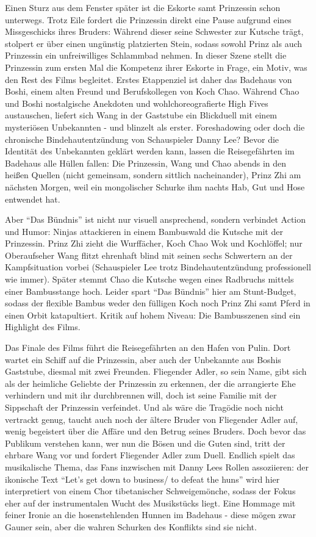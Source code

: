 \documentclass[final]{multiversum}
\begin{document}
Einen Sturz aus dem Fenster später ist die Eskorte samt Prinzessin schon unterwegs. Trotz Eile fordert die Prinzessin
direkt eine Pause aufgrund eines Missgeschicks ihres Bruders: Während dieser seine Schwester zur Kutsche trägt,
stolpert er über einen ungünstig platzierten Stein, sodass sowohl Prinz als auch Prinzessin ein unfreiwilliges
Schlammbad nehmen.
In dieser Szene stellt die Prinzessin zum ersten Mal die Kompetenz ihrer Eskorte in Frage, ein Motiv,
was den Rest des Films begleitet.
Erstes Etappenziel ist daher das Badehaus von Boshi, einem alten Freund und Berufskollegen von Koch Chao.
Während Chao und Boshi nostalgische Anekdoten und wohlchoreografierte High Fives austauschen,
liefert sich Wang in der Gaststube ein Blickduell mit einem mysteriösen Unbekannten - und blinzelt als erster.
Foreshadowing oder doch die chronische Bindehautentzündung von Schauspieler Danny Lee?
Bevor die Identität des Unbekannten geklärt werden kann, lassen die Reisegefährten im Badehaus alle Hüllen fallen:
Die Prinzessin, Wang und Chao abends in den heißen Quellen (nicht gemeinsam, sondern sittlich nacheinander),
Prinz Zhi am nächsten Morgen, weil ein mongolischer Schurke ihm nachts Hab, Gut und Hose entwendet hat.

Aber \enquote{Das Bündnis} ist nicht nur visuell ansprechend, sondern verbindet Action und Humor:
Ninjas attackieren in einem Bambuswald die Kutsche mit der Prinzessin.
Prinz Zhi zieht die Wurffächer, Koch Chao Wok und Kochlöffel; nur Oberaufseher Wang flitzt ehrenhaft blind
mit seinen sechs Schwertern an der Kampfsituation vorbei (Schauspieler Lee trotz Bindehautentzündung professionell wie immer).
Später stemmt Chao die Kutsche wegen eines Radbruchs mittels einer Bambusstange hoch.
Leider spart \enquote{Das Bündnis} hier am Stunt-Budget, sodass der flexible Bambus weder den fülligen Koch
noch Prinz Zhi samt Pferd in einen Orbit katapultiert.
Kritik auf hohem Niveau: Die Bambusszenen sind ein Highlight des Films.

Das Finale des Films führt die Reisegefährten an den Hafen von Pulin.
Dort wartet ein Schiff auf die Prinzessin, aber auch der Unbekannte aus Boshis Gaststube,
diesmal mit zwei Freunden.
Fliegender Adler, so sein Name, gibt sich als der heimliche Geliebte der Prinzessin zu erkennen,
der die arrangierte Ehe verhindern und mit ihr durchbrennen will,
doch ist seine Familie mit der Sippschaft der Prinzessin verfeindet.
Und als wäre die Tragödie noch nicht vertrackt genug, taucht auch noch der ältere Bruder von Fliegender Adler auf,
wenig begeistert über die Affäre und den Betrug seines Bruders.
Doch bevor das Publikum verstehen kann, wer nun die Bösen und die Guten sind,
tritt der ehrbare Wang vor und fordert Fliegender Adler zum Duell.
Endlich spielt das musikalische Thema, das Fans inzwischen mit Danny Lees Rollen assoziieren:
der ikonische Text \enquote{Let's get down to business/ to defeat the huns}
wird hier interpretiert von einem Chor tibetanischer Schweigemönche,
sodass der Fokus eher auf der instrumentalen Wucht des Musikstücks liegt.
Eine Hommage mit feiner Ironie an die hosenstehlenden Hunnen im Badehaus - diese mögen zwar Gauner sein,
aber die wahren Schurken des Konflikts sind sie nicht.
\end{document}

